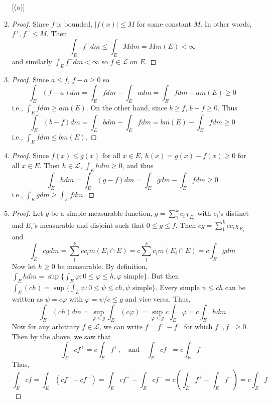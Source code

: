 \documentclass[11pt]{article}
\begin{document}
\begin{exercise}{2}
    \begin{enumerate} [(a)]
        \item \begin{proof}
            Since $f$ is bounded, $|f(x)| \le M$ for some constant $M$. In other words, $f^+, f^- \le M$. Then $$\int_E f^+ dm \le \int_E M dm = M m(E) < \infty$$ and similarly $\int_E f^- dm < \infty$ so $f \in \mathscr{L}$ on $E$.
        \end{proof}
        \item \begin{proof}
            Since $a \le f$, $f - a \ge 0$ so $$\int_E (f - a) dm = \int_E f dm - \int_E a dm = \int_E f dm - a m(E) \ge 0$$ i.e., $\int_E f dm \ge a m(E)$. On the other hand, since $b \ge f$, $b - f \ge 0$. Thus $$\int_E (b - f) dm = \int_E b dm - \int_E f dm = b m(E) - \int_E f dm \ge 0$$ i.e., $\int_E f dm \le b m(E)$.
        \end{proof}
        \item \begin{proof}
            Since $f(x) \le g(x)$ for all $x \in E$, $h(x) = g(x) - f(x) \ge 0$ for all $x \in E$. Then $h \in \mathscr{L}$, $\int_E h dm \ge 0$, and thus $$\int_E h dm = \int_E (g - f) dm = \int_E g dm - \int_E f dm \ge 0$$i.e., $\int_E g dm \ge \int_E f dm$.
        \end{proof}
        \item \begin{proof}
            Let $g$ be a simple measurable function, $g = \sum_1^k c_i \chi_{E_i}$ with $c_i$'s distinct and $E_i$'s measurable and disjoint such that $0 \le g \le f$. Then $cg = \sum_1^k cc_i \chi_{E_i}$ and $$\int_E cg dm = \sum_1^k cc_i m(E_i \cap E) = c \sum_1^k c_i m (E_i \cap E) = c \int_E g dm$$ Now let $h \ge 0$ be measurable. By definition, $\int_E h dm= \sup \{ \int_E \varphi : 0 \le \varphi \le h, \varphi \text{ simple} \}$. But then $\int_E (ch) = \sup \{ \int_E \psi : 0 \le \psi \le ch, \psi \text{ simple} \}$. Every simple $\psi \le ch$ can be written as $\psi = c \varphi$ with $\varphi = \psi /c \le g$ and vice versa. Thus, $$\int_E (ch) dm = \sup_{\varphi \le g} \int_E (c\varphi) = \sup_{\varphi \le g} c \int_E \varphi = c \int_E h dm$$ Now for any arbitrary $f \in \mathscr{L}$, we can write $f = f^+ - f^-$ for which $f^+, f^- \ge 0$. Then by the above, we saw that $$\int_E c f^+ = c \int_E f^+, \quad \text{and} \quad \int_E cf^- = c \int_E f^-$$ Thus, $$\int_E cf = \int_E (cf^+ - cf^-) = \int_E cf^+ - \int_E cf^- = c \left( \int_E f^+ - \int_E f^- \right) = c \int_E f$$

\end{proof}
\end{enumerate}
\end{exercise}
\end{document}
